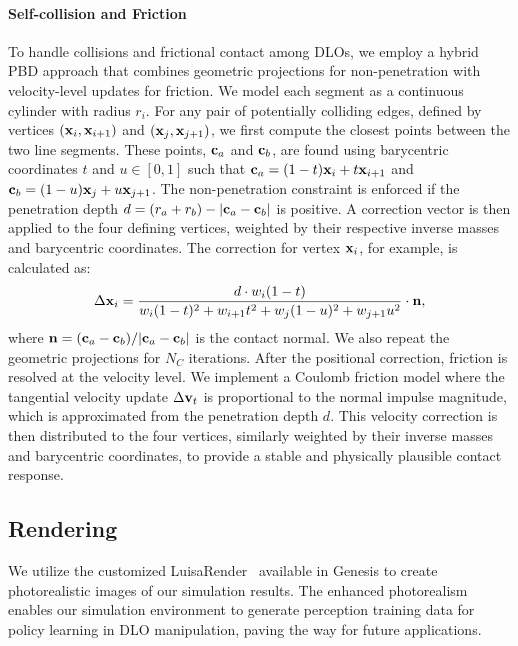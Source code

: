 \paragraph{Self-collision and Friction} To handle collisions and frictional contact among DLOs, we employ a hybrid PBD approach that combines geometric projections for non-penetration with velocity-level updates for friction. We model each segment as a continuous cylinder with radius $r_i$. For any pair of potentially colliding edges, defined by vertices $({\mathbf{x}}_i, {\mathbf{x}}_{i+1})$ and $({\mathbf{x}}_j, {\mathbf{x}}_{j+1})$, we first compute the closest points between the two line segments. These points, ${\mathbf{c}}_a$ and ${\mathbf{c}}_b$, are found using barycentric coordinates $t$ and $u \in [0, 1]$ such that ${\mathbf{c}}_a = (1-t){\mathbf{x}}_i + t{\mathbf{x}}_{i+1}$ and ${\mathbf{c}}_b = (1-u){\mathbf{x}}_j + u{\mathbf{x}}_{j+1}$. The non-penetration constraint is enforced if the penetration depth $d = (r_a + r_b) - |{\mathbf{c}}_a - {\mathbf{c}}_b|$ is positive. A correction vector is then applied to the four defining vertices, weighted by their respective inverse masses and barycentric coordinates. The correction for vertex ${\mathbf{x}}_i$, for example, is calculated as: \begin{equation}
\Delta {\mathbf{x}}_i = \frac{d \cdot w_i (1-t)}{w_i(1-t)^2 + w_{i+1}t^2 + w_j(1-u)^2 + w_{j+1}u^2} \cdot {\mathbf{n}},
\end{equation}
where ${\mathbf{n}} = ({\mathbf{c}}_a - {\mathbf{c}}_b) / |{\mathbf{c}}_a - {\mathbf{c}}_b|$ is the contact normal. We also repeat the geometric projections for $N_C$ iterations. After the positional correction, friction is resolved at the velocity level. We implement a Coulomb friction model where the tangential velocity update $\Delta{\mathbf{v}}_t$ is proportional to the normal impulse magnitude, which is approximated from the penetration depth $d$. This velocity correction is then distributed to the four vertices, similarly weighted by their inverse masses and barycentric coordinates, to provide a stable and physically plausible contact response.


\subsection{Rendering}

We utilize the customized LuisaRender~\citep{zheng2022luisarender} available in Genesis to create photorealistic images of our simulation results. The enhanced photorealism enables our simulation environment to generate perception training data for policy learning in DLO manipulation, paving the way for future applications.

